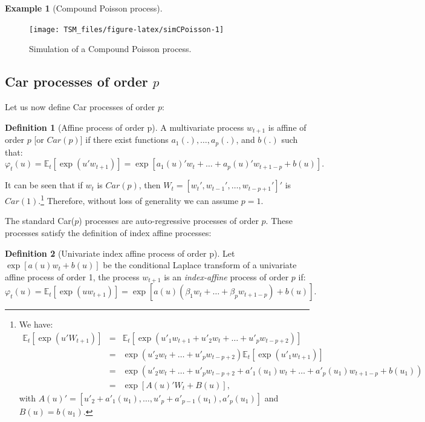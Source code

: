 \documentclass[
  12pt,
]{book}
\theoremstyle{definition}
\newtheorem{definition}{Definition}[chapter]
\theoremstyle{definition}
\newtheorem{example}{Example}[chapter]
\theoremstyle{definition}
\theoremstyle{definition}
\theoremstyle{remark}
\begin{document}
\begin{example}[Compound Poisson process]
\begin{figure}
\texttt{[image: TSM\_files/figure-latex/simCPoisson-1]} \caption{Simulation of a Compound Poisson process.}\label{fig:simCPoisson}
\end{figure}

\end{example}

\hypertarget{SubCarp}{%
\subsection{\texorpdfstring{Car processes of order \(p\)}{Car processes of order p}}\label{SubCarp}}

Let us now define Car processes of order \(p\):

\begin{definition}[Affine process of order p]
\protect\hypertarget{def:Carp}{}\label{def:Carp}A multivariate process \(w_{t+1}\) is affine of order \(p\) {[}or \(Car(p)\){]} if there exist functions \(a_1(.),\dots,a_p(.)\), and \(b(.)\) such that:
\[
\varphi_t(u)=\mathbb{E}_t[\exp(u' w_{t+1})]=\exp[a_1(u)'w_t+\dots+a_p(u)'w_{t+1-p}+b(u)].
\]
\end{definition}

It can be seen that if \(w_t\) is \(Car(p)\), then \(W_t = [w_t', w_{t-1}',\dots,w_{t-p+1}']'\) is \(Car(1)\).\footnote{We have:
  \begin{eqnarray*}
  \mathbb{E}_t[\exp(u'W_{t+1})] &=& \mathbb{E}_t[\exp(u'_1 w_{t+1}+u'_2 w_t+\dots+u'_p w_{t-p+2})] \\
  &=& \exp(u'_2 w_t+\dots+u'_p w_{t-p+2})\mathbb{E}_t[\exp(u'_1 w_{t+1})] \\
  &=& \exp(u'_2 w_t+\dots+u'_p w_{t-p+2}+a'_1(u_1)
  w_t  +\dots+a'_p(u_1)w_{t+1-p}+b(u_1)) \\
  &=& \exp[A(u)'W_t+B(u)],
  \end{eqnarray*}
  with \(A(u)' = [u'_2+a'_1(u_1),\dots,u'_p+a'_{p-1}(u_1), a'_p(u_1)]\) and \(B(u) = b(u_1)\).} Therefore, without loss of generality we can assume \(p = 1\).

The standard Car(\(p\)) processes are auto-regressive processes of order \(p\). These processes satisfy the definition of index affine processes:

\begin{definition}[Univariate index affine process of order p]
Let \(\exp[a(u)w_t+b(u)]\) be the conditional Laplace transform of a univariate affine process of order 1, the process \(w_{t+1}\) is an \emph{index-affine} process of order \(p\) if:
\[
\varphi_t(u)=\mathbb{E}_t[\exp(u w_{t+1})]=\exp[a(u)(\beta_1 w_t+\dots+\beta_p
w_{t+1-p})+b(u)].
\]
\end{definition}
\end{document}
